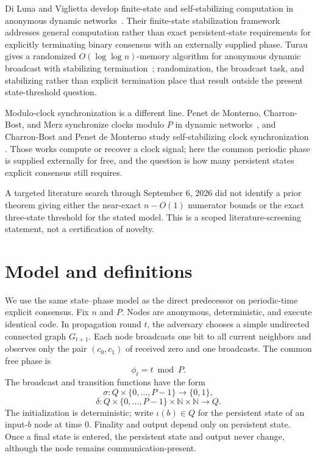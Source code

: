 \documentclass[11pt]{article}
\theoremstyle{remark}
\begin{document}
Di Luna and Viglietta develop finite-state and self-stabilizing computation in anonymous
dynamic networks~\cite{diluna2024}.  Their finite-state stabilization framework addresses
general computation rather than exact persistent-state requirements for explicitly
terminating binary consensus with an externally supplied phase.  Turau gives a randomized
$O(\log\log n)$-memory algorithm for anonymous dynamic broadcast with stabilizing
termination~\cite{turau2026}; randomization, the broadcast task, and stabilizing rather
than explicit termination place that result outside the present state-threshold question.

Modulo-clock synchronization is a different line.  Penet de Monterno, Charron-Bost, and
Merz synchronize clocks modulo $P$ in dynamic networks~\cite{monterno2023}, and
Charron-Bost and Penet de Monterno study self-stabilizing clock synchronization
\cite{charron2022}.  Those works compute or recover a clock signal; here the common
periodic phase is supplied externally for free, and the question is how many persistent
states explicit consensus still requires.

A targeted literature search through September 6, 2026 did not identify a prior theorem
giving either the near-exact $n-O(1)$ numerator bounds or the exact three-state threshold
for the stated model.  This is a scoped literature-screening statement, not a certification
of novelty.

\section{Model and definitions}

We use the same state--phase model as the direct predecessor on periodic-time explicit consensus. Fix $n$ and $P$.  Nodes are anonymous, deterministic, and execute identical code.
In propagation round $t$, the adversary chooses a simple undirected connected graph
$G_{t+1}$.  Each node broadcasts one bit to all current neighbors and observes only
the pair $(c_0,c_1)$ of received zero and one broadcasts.  The common free phase is
\[
\phi_t=t\bmod P.
\]
The broadcast and transition functions have the form
\[
\sigma:Q\times\{0,\ldots,P-1\}\to\{0,1\},
\]
\[
\delta:Q\times\{0,\ldots,P-1\}\times\mathbb N\times\mathbb N\to Q.
\]
The initialization is deterministic; write $\iota(b)\in Q$ for the persistent state
of an input-$b$ node at time $0$.  Finality and output depend only on persistent state.
Once a final state is entered, the persistent state and output never change, although
the node remains communication-present.
\end{document}
